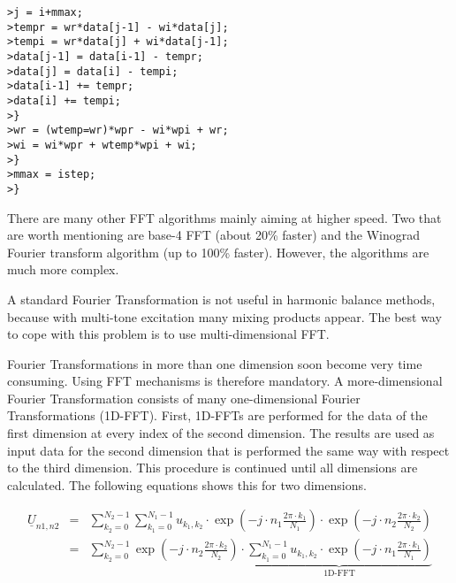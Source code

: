 \texttt{>\quad \qquad\qquad\qquad j = i+mmax;} \\
\texttt{>\quad \qquad\qquad\qquad tempr = wr*data[j-1] - wi*data[j];} \\
\texttt{>\quad \qquad\qquad\qquad tempi = wr*data[j] + wi*data[j-1];} \\
\texttt{>\quad \qquad\qquad\qquad data[j-1] = data[i-1] - tempr;} \\
\texttt{>\quad \qquad\qquad\qquad data[j] = data[i] - tempi;} \\
\texttt{>\quad \qquad\qquad\qquad data[i-1] += tempr;} \\
\texttt{>\quad \qquad\qquad\qquad data[i] += tempi;} \\
\texttt{>\quad \qquad\qquad \}} \\
\texttt{>\quad \qquad\qquad wr = (wtemp=wr)*wpr - wi*wpi + wr;} \\
\texttt{>\quad \qquad\qquad wi = wi*wpr + wtemp*wpi + wi;} \\
\texttt{>\quad \qquad \}} \\
\texttt{>\quad \qquad mmax = istep;} \\
\texttt{>\quad \}}

\addvspace{12pt}

There are many other FFT algorithms mainly aiming at higher speed.
Two that are worth mentioning are base-4 FFT (about 20\% faster)
and the Winograd Fourier transform algorithm (up to 100\% faster).
However, the algorithms are much more complex.

\addvspace{12pt}

A standard Fourier Transformation is not useful in harmonic balance
methods, because with multi-tone excitation many mixing products appear.
The best way to cope with this problem is to use multi-dimensional
FFT.

\addvspace{12pt}

Fourier Transformations in more than one dimension soon become
very time consuming. Using FFT mechanisms is therefore mandatory.
A more-dimensional Fourier Transformation consists of many
one-dimensional Fourier Transformations (1D-FFT). First, 1D-FFTs
are performed for the data of the first dimension at every index
of the second dimension. The results are used as input data for
the second dimension that is performed the same way with respect
to the third dimension. This procedure is continued until all
dimensions are calculated. The following equations shows this
for two dimensions.

\begin{eqnarray}
\underline{U}_{n1,n2} & = & \sum_{k_2=0}^{N_2-1} \sum_{k_1=0}^{N_1-1}
   u_{k_1,k_2}\cdot \exp\left( -j\cdot n_1\frac{2\pi\cdot k_1}{N_1} \right)
              \cdot \exp\left( -j\cdot n_2\frac{2\pi\cdot k_2}{N_2} \right) \\
 & = & \sum_{k_2=0}^{N_2-1} \exp\left( -j\cdot n_2\frac{2\pi\cdot k_2}{N_2} \right)
       \cdot \underbrace{ \sum_{k_1=0}^{N_1-1}
   u_{k_1,k_2}\cdot \exp\left( -j\cdot n_1\frac{2\pi\cdot k_1}{N_1} \right) }_\text{1D-FFT}
\end{eqnarray}


